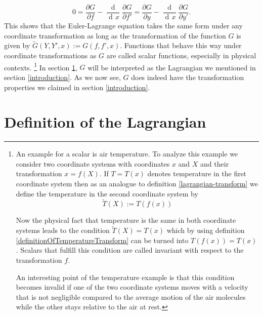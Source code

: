 \documentclass[prb,preprint]{revtex4-1}
\DeclareMathOperator{\dd}{d\!}
\DeclareMathOperator{\ddd}{\mathrm{d}}
\begin{document}
\begin{equation}
0 = \frac{\partial G}{\partial f} - \frac{\ddd}{\dd x} \frac{\partial G}{\partial f'}
= \frac{\partial G}{\partial y} - \frac{\ddd}{\dd x} \frac{\partial G}{\partial y'}.
\end{equation}
This shows that the Euler-Lagrange equation takes the same form under any coordinate transformation as long as the transformation of the function $G$ is given by $\widetilde{G}(Y,Y',x) := G(f,f',x)$. Functions that behave this way under coordinate transformations as $G$ are called scalar functions, especially in physical contexts.
\footnote{An example for a scalar is air temperature.
To analyze this example we consider two coordinate systems with coordinates $x$ and $X$ and their transformation $x=f(X)$.
If $T=T(x)$ denotes temperature in the first coordinate system then as an analogue to definition \eqref{lagrangian-transform} we define the temperature in the second coordinate system by
\begin{equation} \label{definitionOfTemperatureTransform}
  \tilde{T}(X) := T(f(x))
\end{equation}

Now the physical fact that temperature is the same in both coordinate systems leads to the condition $\tilde{T}(X) = T(x)$ which by using definition \ref{definitionOfTemperatureTransform} can be turned into $T(f(x)) = T(x)$.
Scalars that fulfill this condition are called invariant with respect to the transformation $f$.

An interesting point of the temperature example is that this condition becomes invalid if one of the two coordinate systems moves with a velocity that is not negligible compared to the average motion of the air molecules while the other stays relative to the air at rest.
}
In section \ref{lagrangian-def}, $G$ will be interpreted as the Lagrangian we mentioned in section \ref{introduction}. As we now see, $G$ does indeed have the transformation properties we claimed in section \ref{introduction}.

\section{Definition of the Lagrangian}\label{lagrangian-def} %
\end{document}
